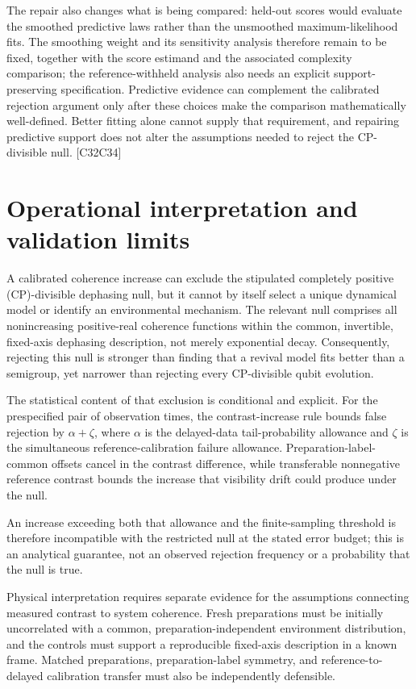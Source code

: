 \documentclass[11pt]{article}
\begin{document}
The repair also changes what is being compared: held-out scores would evaluate the smoothed predictive laws rather than the unsmoothed maximum-likelihood fits. The smoothing weight and its sensitivity analysis therefore remain to be fixed, together with the score estimand and the associated complexity comparison; the reference-withheld analysis also needs an explicit support-preserving specification. Predictive evidence can complement the calibrated rejection argument only after these choices make the comparison mathematically well-defined. Better fitting alone cannot supply that requirement, and repairing predictive support does not alter the assumptions needed to reject the CP-divisible null. [C32\textendash{}C34]

\section{Operational interpretation and validation limits}
A calibrated coherence increase can exclude the stipulated completely positive (CP)-divisible dephasing null, but it cannot by itself select a unique dynamical model or identify an environmental mechanism. The relevant null comprises all nonincreasing positive-real coherence functions within the common, invertible, fixed-axis dephasing description, not merely exponential decay. Consequently, rejecting this null is stronger than finding that a revival model fits better than a semigroup, yet narrower than rejecting every CP-divisible qubit evolution.

The statistical content of that exclusion is conditional and explicit. For the prespecified pair of observation times, the contrast-increase rule bounds false rejection by $\alpha+\zeta$, where $\alpha$ is the delayed-data tail-probability allowance and $\zeta$ is the simultaneous reference-calibration failure allowance. Preparation-label-common offsets cancel in the contrast difference, while transferable nonnegative reference contrast bounds the increase that visibility drift could produce under the null.

An increase exceeding both that allowance and the finite-sampling threshold is therefore incompatible with the restricted null at the stated error budget; this is an analytical guarantee, not an observed rejection frequency or a probability that the null is true.

Physical interpretation requires separate evidence for the assumptions connecting measured contrast to system coherence. Fresh preparations must be initially uncorrelated with a common, preparation-independent environment distribution, and the controls must support a reproducible fixed-axis description in a known frame. Matched preparations, preparation-label symmetry, and reference-to-delayed calibration transfer must also be independently defensible.
\end{document}
